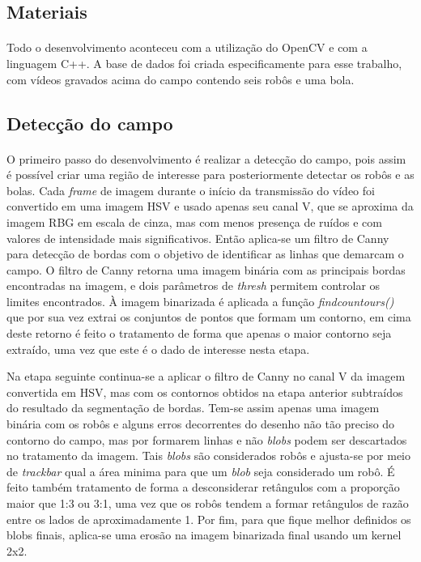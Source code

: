 \documentclass[conference, harvard, brazil, english]{sbatex}
\begin{document}
		\subsection{Materiais}
		\paragraph{}Todo o desenvolvimento aconteceu com a utilização do OpenCV e com a linguagem C++. A base de dados foi criada especificamente para esse trabalho, com vídeos gravados acima do campo contendo seis robôs e uma bola.
		\subsection{Detecção do campo}
		\paragraph{}
		O primeiro passo do desenvolvimento é realizar a detecção do campo, pois assim é possível criar uma região de interesse para posteriormente detectar os robôs e as bolas. Cada \textit{frame} de imagem durante o início da transmissão do vídeo foi convertido em uma imagem HSV e usado apenas seu canal V, que se aproxima da imagem RBG em escala de cinza, mas com menos presença de ruídos e com valores de intensidade mais significativos. Então aplica-se um filtro de Canny para detecção de bordas com o objetivo de identificar as linhas que demarcam o campo. O filtro de Canny retorna uma imagem binária com as principais bordas encontradas na imagem, e dois parâmetros de \textit{thresh} permitem controlar os limites encontrados. À imagem binarizada é aplicada a função \textit{findcountours()} que por sua vez extrai os conjuntos de pontos que formam um contorno, em cima deste retorno é feito o tratamento de forma que apenas o maior contorno seja extraído, uma vez que este é o dado de interesse nesta etapa.
		\par Na etapa seguinte continua-se a aplicar o filtro de Canny no canal V da imagem convertida em HSV, mas com os contornos obtidos na etapa anterior subtraídos do resultado da segmentação de bordas. Tem-se assim apenas uma imagem binária com os robôs e alguns erros decorrentes do desenho não tão preciso do contorno do campo, mas por formarem linhas e não \textit{blobs} podem ser descartados no tratamento da imagem. Tais \textit{blobs} são considerados robôs e ajusta-se por meio de \textit{trackbar} qual a área minima para que um \textit{blob} seja considerado um robô. É feito também tratamento de forma a desconsiderar retângulos com a proporção maior que 1:3 ou 3:1, uma vez que os robôs tendem a formar retângulos de razão entre os lados de aproximadamente 1. Por fim, para que fique melhor definidos os blobs finais, aplica-se uma erosão na imagem binarizada final usando um kernel 2x2.
\end{document}
